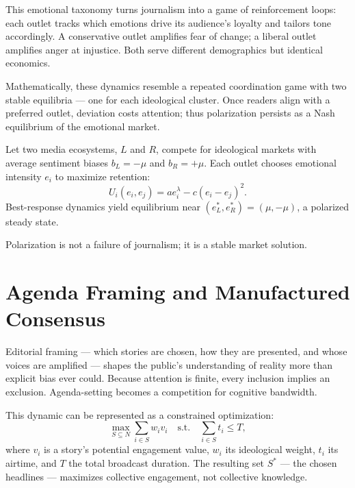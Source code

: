 \documentclass[12pt,twoside]{book}
\begin{document}
This emotional taxonomy turns journalism into a game of reinforcement loops: each outlet tracks which emotions drive its audience’s loyalty and tailors tone accordingly.  
A conservative outlet amplifies fear of change; a liberal outlet amplifies anger at injustice.  
Both serve different demographics but identical economics.  

Mathematically, these dynamics resemble a repeated coordination game with two stable equilibria --- one for each ideological cluster.  
Once readers align with a preferred outlet, deviation costs attention; thus polarization persists as a Nash equilibrium of the emotional market.

\begin{tcolorbox}[colback=gray!5,colframe=gray!60,boxrule=0.4pt,arc=1mm,
title={Mathematical Interlude: Polarized Best Responses}]
Let two media ecosystems, $L$ and $R$, compete for ideological markets with average sentiment biases $b_L=-\mu$ and $b_R=+\mu$.  
Each outlet chooses emotional intensity $e_i$ to maximize retention:
\[
U_i(e_i,e_j) = a e_i^\lambda - c(e_i-e_j)^2.
\]
Best-response dynamics yield equilibrium near $(e_L^*,e_R^*) = (\mu, -\mu)$, a polarized steady state.
\end{tcolorbox}

\begin{keyidea}
Polarization is not a failure of journalism; it is a stable market solution.
\end{keyidea}

\section{Agenda Framing and Manufactured Consensus}

Editorial framing --- which stories are chosen, how they are presented, and whose voices are amplified --- shapes the public’s understanding of reality more than explicit bias ever could.  
Because attention is finite, every inclusion implies an exclusion.  
Agenda-setting becomes a competition for cognitive bandwidth.

This dynamic can be represented as a constrained optimization:
\[
\max_{S \subseteq N} \sum_{i \in S} w_i v_i \quad \text{s.t.} \quad \sum_{i \in S} t_i \le T,
\]
where \(v_i\) is a story’s potential engagement value, \(w_i\) its ideological weight, \(t_i\) its airtime, and \(T\) the total broadcast duration.  
The resulting set \(S^*\) --- the chosen headlines --- maximizes collective engagement, not collective knowledge.
\end{document}
